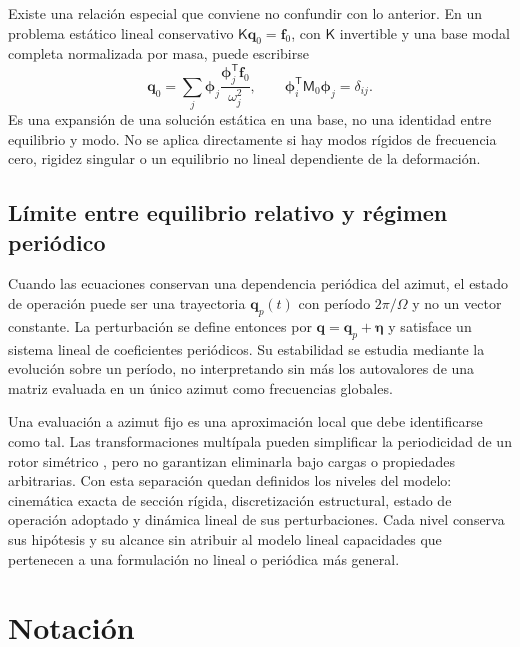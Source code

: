 \documentclass[11pt,a4paper,oneside]{report}
\newcommand{\vct}[1]{\bm{#1}}
\newcommand{\tr}{\mathsf T}
\begin{document}
Existe una relación especial que conviene no confundir con lo anterior. En un problema estático lineal conservativo $\mathsf K\vct q_0=\vct f_0$, con $\mathsf K$ invertible y una base modal completa normalizada por masa, puede escribirse
\begin{equation}
 \vct q_0=\sum_j\vct\phi_j\frac{\vct\phi_j^{\tr}\vct f_0}{\omega_j^2},
 \qquad\vct\phi_i^{\tr}\mathsf M_0\vct\phi_j=\delta_{ij}.
\end{equation}
Es una expansión de una solución estática en una base, no una identidad entre equilibrio y modo. No se aplica directamente si hay modos rígidos de frecuencia cero, rigidez singular o un equilibrio no lineal dependiente de la deformación.

\section{Límite entre equilibrio relativo y régimen periódico}
Cuando las ecuaciones conservan una dependencia periódica del azimut, el estado de operación puede ser una trayectoria $\vct q_p(t)$ con período $2\pi/\Omega$ y no un vector constante. La perturbación se define entonces por $\vct q=\vct q_p+\vct\eta$ y satisface un sistema lineal de coeficientes periódicos. Su estabilidad se estudia mediante la evolución sobre un período, no interpretando sin más los autovalores de una matriz evaluada en un único azimut como frecuencias globales.

Una evaluación a azimut fijo es una aproximación local que debe identificarse como tal. Las transformaciones multípala pueden simplificar la periodicidad de un rotor simétrico \cite{bir}, pero no garantizan eliminarla bajo cargas o propiedades arbitrarias. Con esta separación quedan definidos los niveles del modelo: cinemática exacta de sección rígida, discretización estructural, estado de operación adoptado y dinámica lineal de sus perturbaciones. Cada nivel conserva sus hipótesis y su alcance sin atribuir al modelo lineal capacidades que pertenecen a una formulación no lineal o periódica más general.
\appendix
\chapter{Notación}
\small
\end{document}
